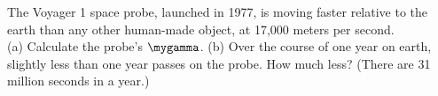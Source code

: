 The Voyager 1 space probe, launched in 1977, is moving faster relative to the earth than
any other human-made object, at 17,000 meters per second. \\
(a) Calculate the probe's $\mygamma$.\hwendpart
(b) Over the course of one year on earth, slightly less than one year passes on the probe.
How much less? (There are 31 million seconds in a year.)\answercheck
